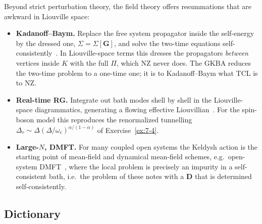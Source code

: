 Beyond strict perturbation theory, the field theory offers resummations that are awkward in Liouville space:
\begin{itemize}[itemsep=1pt]
\item \textbf{Kadanoff--Baym.}
  Replace the free system propagator inside the self-energy by the dressed one, $\Sigma=\Sigma[\mathbf G]$, and solve the two-time equations self-consistently~\cite{KadanoffBaym,StefanucciVanLeeuwen}.
  In Liouville-space terms this dresses the propagators \emph{between} vertices inside $K$ with the full $\Pi$, which NZ never does.
  The GKBA reduces the two-time problem to a one-time one; it is to Kadanoff--Baym what TCL is to NZ.
\item \textbf{Real-time RG.}
  Integrate out bath modes shell by shell in the Liouville-space diagrammatics, generating a flowing effective Liouvillian~\cite{Schoeller2009,Keil2001}.
  For the spin-boson model this reproduces the renormalized tunnelling $\Delta_r\sim\Delta(\Delta/\omega_c)^{\alpha/(1-\alpha)}$ of Exercise~\ref{ex:7-4}.
\item \textbf{Large-$N$, DMFT.}
  For many coupled open systems the Keldysh action is the starting point of mean-field and dynamical mean-field schemes, e.g.\ open-system DMFT~\cite{Scarlatella2021}, where the local problem is precisely an impurity in a self-consistent bath, i.e.\ the problem of these notes with a $\mathbf D$ that is determined self-consistently.
\end{itemize}

\subsection{Dictionary}

